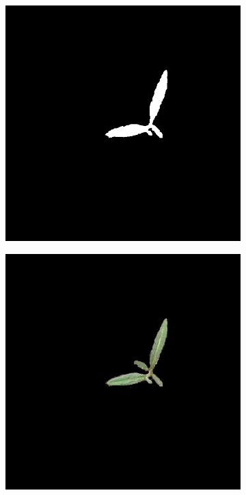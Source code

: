 \begin{figure}[]
\begin{subfigure}[b]{0.3\textwidth}
		\caption{}
		\label{fig:seg_f}
    \end{subfigure}
    \begin{subfigure}[b]{0.3\textwidth}
        \centering
        \includegraphics[width=\textwidth]{./figure/result/segmentation/imgHSIThresholdClean.png}
		\caption{}
		\label{fig:seg_g}
    \end{subfigure}
    \begin{subfigure}[b]{0.3\textwidth}
        \centering
        \includegraphics[width=\textwidth]{./figure/result/segmentation/imgSEG.png}

\end{subfigure}
\end{figure}

